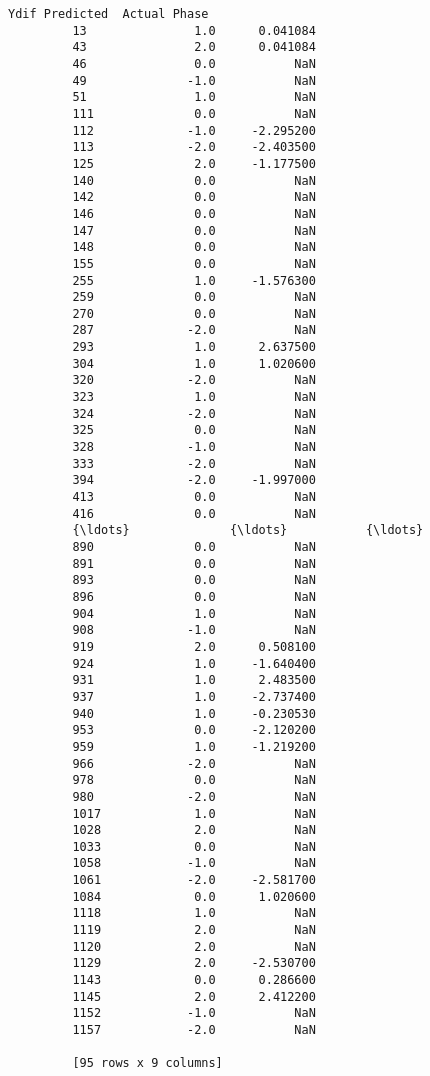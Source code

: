 \documentclass[11pt]{article}
\begin{document}
\begin{Verbatim}[commandchars=\\\{\}]
               Ydif Predicted  Actual Phase  
         13               1.0      0.041084  
         43               2.0      0.041084  
         46               0.0           NaN  
         49              -1.0           NaN  
         51               1.0           NaN  
         111              0.0           NaN  
         112             -1.0     -2.295200  
         113             -2.0     -2.403500  
         125              2.0     -1.177500  
         140              0.0           NaN  
         142              0.0           NaN  
         146              0.0           NaN  
         147              0.0           NaN  
         148              0.0           NaN  
         155              0.0           NaN  
         255              1.0     -1.576300  
         259              0.0           NaN  
         270              0.0           NaN  
         287             -2.0           NaN  
         293              1.0      2.637500  
         304              1.0      1.020600  
         320             -2.0           NaN  
         323              1.0           NaN  
         324             -2.0           NaN  
         325              0.0           NaN  
         328             -1.0           NaN  
         333             -2.0           NaN  
         394             -2.0     -1.997000  
         413              0.0           NaN  
         416              0.0           NaN  
         {\ldots}              {\ldots}           {\ldots}  
         890              0.0           NaN  
         891              0.0           NaN  
         893              0.0           NaN  
         896              0.0           NaN  
         904              1.0           NaN  
         908             -1.0           NaN  
         919              2.0      0.508100  
         924              1.0     -1.640400  
         931              1.0      2.483500  
         937              1.0     -2.737400  
         940              1.0     -0.230530  
         953              0.0     -2.120200  
         959              1.0     -1.219200  
         966             -2.0           NaN  
         978              0.0           NaN  
         980             -2.0           NaN  
         1017             1.0           NaN  
         1028             2.0           NaN  
         1033             0.0           NaN  
         1058            -1.0           NaN  
         1061            -2.0     -2.581700  
         1084             0.0      1.020600  
         1118             1.0           NaN  
         1119             2.0           NaN  
         1120             2.0           NaN  
         1129             2.0     -2.530700  
         1143             0.0      0.286600  
         1145             2.0      2.412200  
         1152            -1.0           NaN  
         1157            -2.0           NaN  
         
         [95 rows x 9 columns]
\end{Verbatim}
            

    
    
    
    
\end{document}
